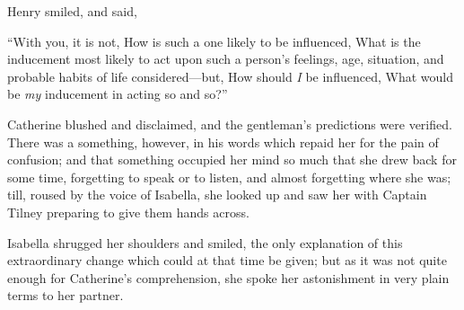 Henry smiled, and said, 


“With you, it is not, How is such a one likely to be influenced, What is the inducement most likely to act upon such a person's feelings, age, situation, and probable habits of life considered---but, How should {\em I} be influenced, What would be {\em my} inducement in acting so and so?”









Catherine blushed and disclaimed, and the gentleman's predictions were verified. There was a something, however, in his words which repaid her for the pain of confusion; and that something occupied her mind so much that she drew back for some time, forgetting to speak or to listen, and almost forgetting where she was; till, roused by the voice of Isabella, she looked up and saw her with Captain Tilney preparing to give them hands across.

Isabella shrugged her shoulders and smiled, the only explanation of this extraordinary change which could at that time be given; but as it was not quite enough for Catherine's comprehension, she spoke her astonishment in very plain terms to her partner.



